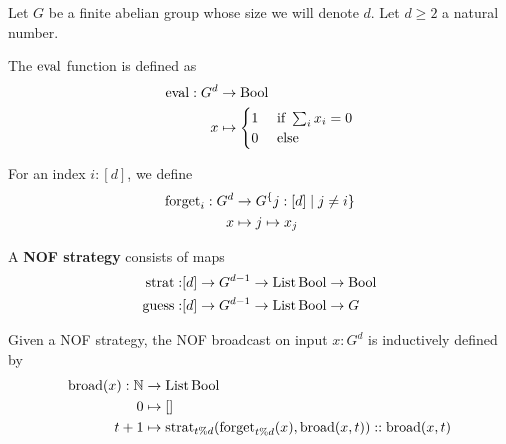 
Let $G$ be a finite abelian group whose size we will denote $d$. Let $d \ge 2$ a natural number.

\begin{definition}
  \label{def:eval}
  \uses{}

  The $\operatorname{eval}$ function is defined as
  \begin{align}
      \operatorname{eval} : G^d & \to \operatorname{Bool} \\
      x & \mapsto \begin{cases}
      1 & \text{ if } \sum_i x_i = 0 \\
      0 & \text{ else}
    \end{cases}
  \end{align}
\end{definition}

\begin{definition}
  \label{def:forget}

  For an index $i : [d]$, we define
  \begin{align}
    \operatorname{forget}_i : G^d & \to G^\{j : [d] \mid j \ne i\} \\
    x & \mapsto j \mapsto x_j
  \end{align}
\end{definition}

\begin{definition}
  \label{def:strategy}
  \uses{}

  A {\bf NOF strategy} consists of maps
  \begin{align}
    \operatorname{strat} : & [d] \to G^{d - 1} \to \operatorname{List} \operatorname{Bool} \to \operatorname{Bool} \\
    \operatorname{guess} : & [d] \to G^{d - 1} \to \operatorname{List} \operatorname{Bool} \to G
  \end{align}
\end{definition}

\begin{definition}
  \label{def:broadcast}

  Given a NOF strategy, the NOF broadcast on input $x : G^d$ is inductively defined by
  \begin{align}
    \operatorname{broad}(x) : \mathbb{N} & \to \operatorname{List} \operatorname{Bool} \\
    0 & \mapsto [] \\
    t + 1 & \mapsto \operatorname{strat}_{t \% d}(\operatorname{forget}_{t \% d}(x), \operatorname{broad}(x, t)) :: \operatorname{broad}(x, t)
  \end{align}
\end{definition}

